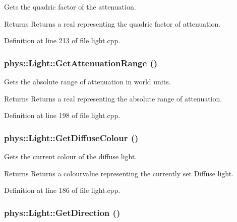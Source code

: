 Gets the quadric factor of the attenuation. 

\begin{DoxyReturn}{Returns}
Returns a real representing the quadric factor of attenuation. 
\end{DoxyReturn}


Definition at line 213 of file light.cpp.

\hypertarget{classphys_1_1Light_a23a8b0fe2bee88d45ef647165357186a}{
\subsubsection[{GetAttenuationRange}]{ phys::Light::GetAttenuationRange ()}}
\label{dc/df1/classphys_1_1Light_a23a8b0fe2bee88d45ef647165357186a}


Gets the absolute range of attenuation in world units. 

\begin{DoxyReturn}{Returns}
Returns a real representing the absolute range of attenuation. 
\end{DoxyReturn}


Definition at line 198 of file light.cpp.

\hypertarget{classphys_1_1Light_a2f21391ae6a8bf6cc8c8a6b1196f0ed4}{
\subsubsection[{GetDiffuseColour}]{ phys::Light::GetDiffuseColour ()}}
\label{dc/df1/classphys_1_1Light_a2f21391ae6a8bf6cc8c8a6b1196f0ed4}


Gets the current colour of the diffuse light. 

\begin{DoxyReturn}{Returns}
Returns a colourvalue representing the currently set Diffuse light. 
\end{DoxyReturn}


Definition at line 186 of file light.cpp.

\hypertarget{classphys_1_1Light_a2c7051ac99d359da14b192852f78bc69}{
\subsubsection[{GetDirection}]{ phys::Light::GetDirection ()}}
\label{dc/df1/classphys_1_1Light_a2c7051ac99d359da14b192852f78bc69}


